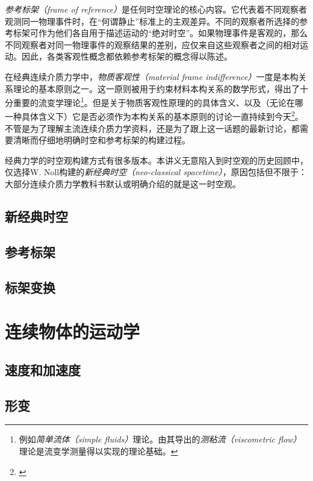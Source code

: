 \documentclass[zihao=-4,linespread=1.5,a4paper,heading=true,twoside]{ctexbook}
\theoremstyle{definition}
\theoremstyle{plain}
\begin{document}
\emph{参考标架（frame of reference）}是任何时空理论的核心内容。它代表着不同观察者观测同一物理事件时，在“何谓静止”标准上的主观差异。不同的观察者所选择的参考标架可作为他们各自用于描述运动的“绝对时空”。如果物理事件是客观的，那么不同观察者对同一物理事件的观察结果的差别，应仅来自这些观察者之间的相对运动。因此，各类客观性概念都依赖参考标架的概念得以陈述。

在经典连续介质力学中，\emph{物质客观性（material frame indifference）}一度是本构关系理论的基本原则之一\cite[Sect.293]{Truesdell1960}\cite[Sect.19]{Truesdell2004}。这一原则被用于约束材料本构关系的数学形式，得出了十分重要的流变学理论\footnote{例如\emph{简单流体（simple fluids）}理论\cite{Noll1958}。由其导出的\emph{测粘流（viscometric flow）}理论是流变学测量得以实现的理论基础\cite{Coleman1966}\cite{Walters1975}。}。但是关于物质客观性原理的的具体含义、以及（无论在哪一种具体含义下）它是否必须作为本构关系的基本原则的讨论一直持续到今天\footnote{\cite{Gennes1983}\cite{Frewer2009}}。不管是为了理解主流连续介质力学资料，还是为了跟上这一话题的最新讨论，都需要清晰而仔细地明确时空和参考标架的构建过程。

经典力学的时空观构建方式有很多版本\cite{Weatherall2022}。本讲义无意陷入到时空观的历史回顾中，仅选择W. Noll\cite{Noll1973}构建的\emph{新经典时空（neo-classical spacetime）}，原因包括但不限于：大部分连续介质力学教科书默认或明确介绍的就是这一时空观。
\section{新经典时空}\label{sec:III.5.1}

\section{参考标架}\label{sec:III.5.2}

\section{标架变换}\label{sec:III.5.3}


\chapter{连续物体的运动学}\label{sec:III.6}
\section{速度和加速度}\label{sec:III.6.1}

\section{形变}\label{sec:III.6.2}

\end{document}
